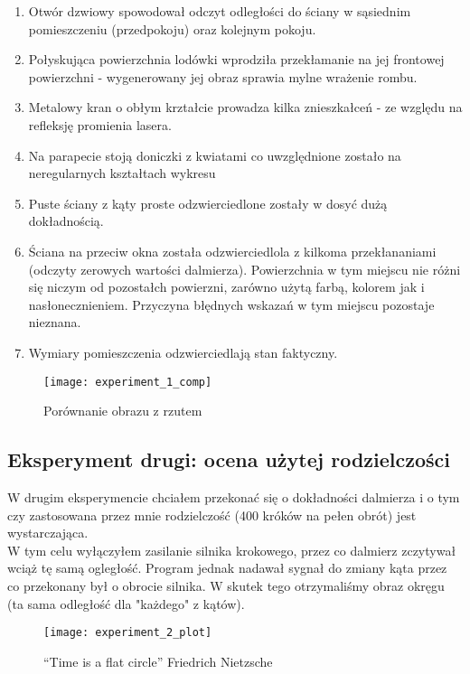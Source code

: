 \begin{enumerate}
    \item Otwór dzwiowy spowodował odczyt odległości do ściany w sąsiednim pomieszczeniu (przedpokoju) oraz kolejnym pokoju.
    \item Połyskująca powierzchnia lodówki wprodziła przekłamanie na jej frontowej powierzchni - wygenerowany jej obraz sprawia mylne wrażenie rombu. 
    \item Metalowy kran o obłym krztałcie prowadza kilka znieszkałceń - ze względu na refleksję promienia lasera.
    \item Na parapecie stoją doniczki z kwiatami co uwzględnione zostało na neregularnych kształtach wykresu
    \item Puste ściany z kąty proste odzwierciedlone zostały w dosyć dużą dokładnością.
    \item Ściana na przeciw okna została odzwierciedlola z kilkoma przekłananiami (odczyty zerowych wartości dalmierza). Powierzchnia w tym miejscu nie różni się niczym od pozostałch powierzni, zarówno użytą farbą, kolorem jak i nasłonecznieniem. Przyczyna błędnych wskazań w tym miejscu pozostaje nieznana.
    \item Wymiary pomieszczenia odzwierciedlają stan faktyczny.
\end{enumerate}
\begin{figure}[h]
    \centering
    \texttt{[image: experiment\_1\_comp]}
    \caption{Porównanie obrazu z rzutem}
    \label{fig:experiment_1_comp}
\end{figure}


\newpage
\subsection {Eksperyment drugi: ocena użytej rodzielczości}

W drugim eksperymencie chciałem przekonać się o dokładności dalmierza i o tym czy zastosowana przez mnie rodzielczość (400 króków na pełen obrót) jest wystarczająca.\\

W tym celu wyłączyłem zasilanie silnika krokowego, przez co dalmierz zczytywał wciąż tę samą ogległość. Program jednak nadawał sygnał do zmiany kąta przez co przekonany był o obrocie silnika. W skutek tego otrzymaliśmy obraz okręgu (ta sama odległość dla "każdego" z kątów).

\begin{figure}[h]
    \centering
    \texttt{[image: experiment\_2\_plot]}
    \caption{“Time is a flat circle” Friedrich Nietzsche}
    \label{fig:experiment_2_plot}
\end{figure}


